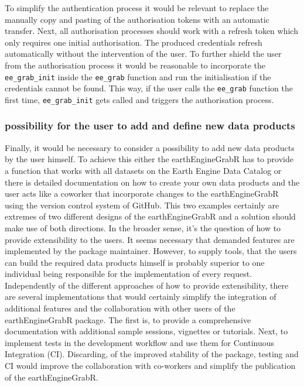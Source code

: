 \documentclass[12pt,twoside,a4paper,final]{report}
\begin{document}
To simplify the authentication process it would be relevant to replace the manually copy and pasting of the authorisation tokens with an automatic transfer. Next, all authorisation processes should work with a refresh token which only requires one initial authorisation. The produced credentials refresh automatically without the intervention of the user. To further shield the user from the authorisation process it would be reasonable to incorporate the \texttt{ee\_grab\_init} inside the \texttt{ee\_grab} function and run the initialisation if the credentials cannot be found. This way, if the user calls the \texttt{ee\_grab} function the first time, \texttt{ee\_grab\_init} gets called and triggers the authorisation process. 


\subsubsection{possibility for the user to add and define new data products}


Finally, it would be necessary to consider a possibility to add new data products by the user himself. To achieve this either the earthEngineGrabR has to provide a function that works with all datasets on the Earth Engine Data Catalog or there is detailed documentation on how to create your own data products and the user acts like a coworker that incorporate changes to the earthEngineGrabR using the version control system of GitHub. This two examples certainly are extremes of two different designs of the earthEngineGrabR and a solution should make use of both directions. In the broader sense, it's the question of how to provide extensibility to the users. It seems necessary that demanded features are implemented by the package maintainer. However, to supply tools, that the users can build the required data products himself is probably superior to one individual being responsible for the implementation of every request.
Independently of the different approaches of how to provide extensibility, there are several implementations that would certainly simplify the integration of additional features and the collaboration with other users of the earthEngineGrabR package. The first is, to provide a comprehensive documentation with additional sample sessions, vignettes or tutorials. Next, to implement tests in the development workflow and use them for Continuous Integration (CI). Discarding, of the improved stability of the package, testing and CI would improve the collaboration with co-workers and simplify the publication of the earthEngineGrabR. 
\end{document}
